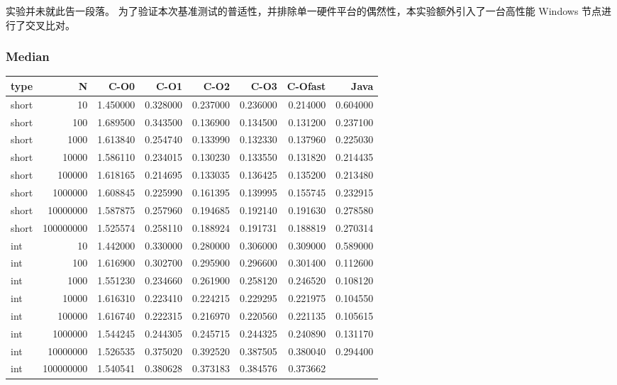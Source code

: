 \documentclass[12pt,fontset=none]{ctexart}
\newcounter{none}
\begin{document}
实验并未就此告一段落。
为了验证本次基准测试的普适性，并排除单一硬件平台的偶然性，本实验额外引入了一台高性能
Windows 节点进行了交叉比对。

\subsubsection{Median}\label{median-1}

{\def\LTcaptype{none} %
\begin{longtable}[]{@{}lrrrrrrr@{}}
\toprule\noalign{}
type & N & C-O0 & C-O1 & C-O2 & C-O3 & C-Ofast & Java \\
\midrule\noalign{}
\endhead
\bottomrule\noalign{}
\endlastfoot
short & 10 & 1.450000 & 0.328000 & 0.237000 & 0.236000 & 0.214000 &
0.604000 \\
short & 100 & 1.689500 & 0.343500 & 0.136900 & 0.134500 & 0.131200 &
0.237100 \\
short & 1000 & 1.613840 & 0.254740 & 0.133990 & 0.132330 & 0.137960 &
0.225030 \\
short & 10000 & 1.586110 & 0.234015 & 0.130230 & 0.133550 & 0.131820 &
0.214435 \\
short & 100000 & 1.618165 & 0.214695 & 0.133035 & 0.136425 & 0.135200 &
0.213480 \\
short & 1000000 & 1.608845 & 0.225990 & 0.161395 & 0.139995 & 0.155745 &
0.232915 \\
short & 10000000 & 1.587875 & 0.257960 & 0.194685 & 0.192140 & 0.191630
& 0.278580 \\
short & 100000000 & 1.525574 & 0.258110 & 0.188924 & 0.191731 & 0.188819
& 0.270314 \\
int & 10 & 1.442000 & 0.330000 & 0.280000 & 0.306000 & 0.309000 &
0.589000 \\
int & 100 & 1.616900 & 0.302700 & 0.295900 & 0.296600 & 0.301400 &
0.112600 \\
int & 1000 & 1.551230 & 0.234660 & 0.261900 & 0.258120 & 0.246520 &
0.108120 \\
int & 10000 & 1.616310 & 0.223410 & 0.224215 & 0.229295 & 0.221975 &
0.104550 \\
int & 100000 & 1.616740 & 0.222315 & 0.216970 & 0.220560 & 0.221135 &
0.105615 \\
int & 1000000 & 1.544245 & 0.244305 & 0.245715 & 0.244325 & 0.240890 &
0.131170 \\
int & 10000000 & 1.526535 & 0.375020 & 0.392520 & 0.387505 & 0.380040 &
0.294400 \\
int & 100000000 & 1.540541 & 0.380628 & 0.373183 & 0.384576 & 0.373662 &

\end{longtable}}
\end{document}

